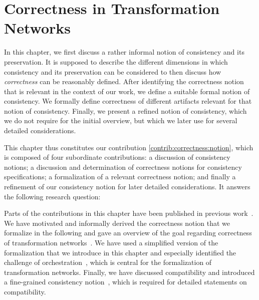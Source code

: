 \chapter{Correctness in Transformation Networks
}
\label{chap:correctness}

In this chapter, we first discuss a rather informal notion of consistency and its preservation. It is supposed to describe the different dimensions in which consistency and its preservation can be considered to then discuss how \emph{correctness} can be reasonably defined.
After identifying the correctness notion that is relevant in the context of our work, we define a suitable formal notion of consistency.
We formally define correctness of different artifacts relevant for that notion of consistency.
Finally, we present a refined notion of consistency, which we do not require for the initial overview, but which we later use for several detailed considerations.

This chapter thus constitutes our contribution \autoref{contrib:correctness:notion}, which is composed of four subordinate contributions: a discussion of consistency notions; a discussion and determination of correctness notions for consistency specifications; a formalization of a relevant correctness notion; and finally a refinement of our consistency notion for later detailed considerations.
It answers the following research question:


Parts of the contributions in this chapter have been published in previous work~.
We have motivated and informally derived the correctness notion that we formalize in the following and gave an overview of the goal regarding correctness of transformation networks~.
We have used a simplified version of the formalization that we introduce in this chapter and especially identified the challenge of orchestration~, which is central for the formalization of transformation networks.
Finally, we have discussed compatibility and introduced a fine-grained consistency notion~, which is required for detailed statements on compatibility.






